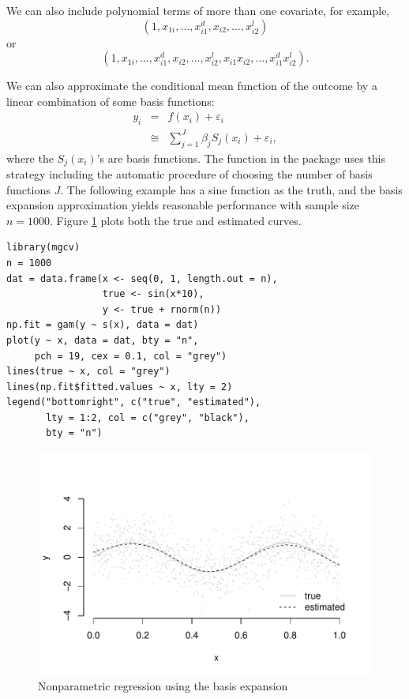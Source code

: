 We can also include polynomial terms of more than one covariate, for example,
$$
(1,x_{1i},\ldots,x_{i1}^{d},x_{i2},\ldots,x_{i2}^{l})
$$
or 
$$
(1,x_{1i},\ldots,x_{i1}^{d},x_{i2},\ldots,x_{i2}^{l},x_{i1}x_{i2},\ldots,x_{i1}^{d}x_{i2}^{l}).
$$
 


We can also approximate the conditional mean function of the outcome by a linear combination of some basis functions:
\begin{eqnarray*}
y_{i} &=& f(x_{i})+\varepsilon_{i} \\
& \cong & \sum_{j=1}^{J}\beta_{j}S_{j}(x_{i})+\varepsilon_{i},
\end{eqnarray*}
where the $S_{j}(x_{i})$'s are basis functions. The  function in the  package uses this strategy including the automatic procedure of choosing the number of basis functions $J$. The following example has a sine function as the truth, and the basis expansion approximation yields reasonable performance with sample size $n=1000$. Figure \ref{fig::npreg-basis} plots both the true and estimated curves.

\begin{lstlisting}
library(mgcv)
n = 1000
dat = data.frame(x <- seq(0, 1, length.out = n),
                 true <- sin(x*10),
                 y <- true + rnorm(n))
np.fit = gam(y ~ s(x), data = dat)
plot(y ~ x, data = dat, bty = "n",
     pch = 19, cex = 0.1, col = "grey")
lines(true ~ x, col = "grey") 
lines(np.fit$fitted.values ~ x, lty = 2)
legend("bottomright", c("true", "estimated"), 
       lty = 1:2, col = c("grey", "black"), 
       bty = "n")
\end{lstlisting} 




\begin{figure}
\centering 
\includegraphics[width =  \textwidth]{figures/npregbasis.pdf}
\caption{Nonparametric regression using the basis expansion}\label{fig::npreg-basis}
\end{figure}


